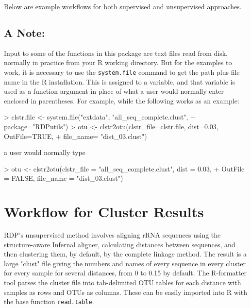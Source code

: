 \documentclass{article}
\begin{document}
Below are example workflows for both supervised and unsupervised approaches.

\subsection*{A Note:}
Input to some of the functions in this package are text files read from disk, normally in practice from your R working directory.  But for the examples to work, it is necessary to use the \texttt{system.file} command to get the path plus file name in the R installation.   This is assigned to a variable, and that variable is used as a function argument in place of what a user would normally enter enclosed in parentheses.  For example, while the following works as an example:
\begin{Schunk}
\begin{Sinput}
> clstr.file <- system.file("extdata", "all_seq_complete.clust",
+                           package="RDPutils")
> otu <- clstr2otu(clstr_file=clstr.file, dist=0.03, OutFile=TRUE,
+                  file_name= "dist_03.clust")
\end{Sinput}
\end{Schunk}
a user would normally type
\begin{Schunk}
\begin{Sinput}
> otu <- clstr2otu(clstr_file = "all_seq_complete.clust", dist = 0.03,
+                  OutFile = FALSE, file_name = "dist_03.clust")
\end{Sinput}
\end{Schunk}
\section*{Workflow for Cluster Results}
RDP's unsupervised method involves aligning rRNA sequences using the structure-aware Infernal aligner, calculating distances between sequences, and then clustering them, by default, by the complete linkage method.  The result is a large "clust" file giving the numbers and names of every sequence in every cluster for every sample for several distances, from 0 to 0.15 by default. The R-formatter tool parses the cluster file into tab-delimited OTU tables for each distance with samples as rows and OTUs as columns.  These can be easily imported into R with the base function \texttt{read.table}.
\end{document}
